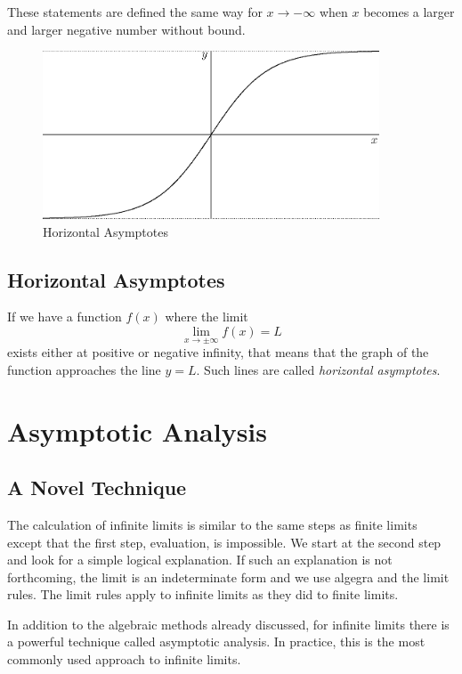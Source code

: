 \documentclass[fleqn]{report}
\begin{document}
These statements are defined the same way for $x \rightarrow
-\infty$ when $x$ becomes a larger and larger negative number
without bound.

\begin{figure}[t]
\centering
\includegraphics[width=10cm]{figure20.eps}
\caption{Horizontal Asymptotes}
\label{figure-horizontal-Asymptotes}
\end{figure}

\subsection{Horizontal Asymptotes}
\label{horizontal-asymptotes}

If we have a function $f(x)$ where the limit 
\begin{equation*}
\lim_{x \rightarrow \pm \infty} f(x) = L
\end{equation*}
exists either at positive or negative infinity, that means
that the graph of the function approaches the line $y=L$.
Such lines are called \emph{horizontal asymptotes}.

\section{Asymptotic Analysis}
\label{asymptotic analysis}

\subsection{A Novel Technique}
\label{novel-technique}

The calculation of infinite limits is similar to the same
steps as finite limits except that the first step, evaluation,
is impossible. We start at the second step and look for a
simple logical explanation. If such an explanation is not
forthcoming, the limit is an indeterminate form and we use
algegra and the limit rules. The limit rules apply to infinite
limits as they did to finite limits.

In addition to the algebraic methods already discussed, for
infinite limits there is a powerful technique called
asymptotic analysis. In practice, this is the most commonly
used approach to infinite limits.
\end{document}
